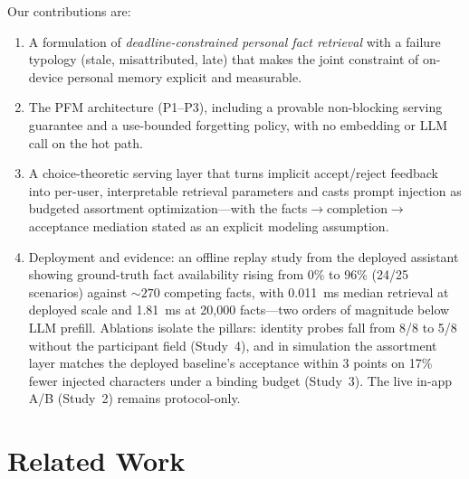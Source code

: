 \documentclass[letterpaper]{article}
\begin{document}
Our contributions are:
\begin{enumerate}
\item A formulation of \emph{deadline-constrained personal fact retrieval}
  with a failure typology (stale, misattributed, late) that makes the
  joint constraint of on-device personal memory explicit and measurable.
\item The PFM architecture (P1--P3), including a provable non-blocking
  serving guarantee and a use-bounded forgetting policy, with no
  embedding or LLM call on the hot path.
\item A choice-theoretic serving layer that turns implicit accept/reject
  feedback into per-user, interpretable retrieval parameters and casts
  prompt injection as budgeted assortment optimization---with the
  facts$\rightarrow$completion$\rightarrow$acceptance mediation stated as
  an explicit modeling assumption.
\item Deployment and evidence: an offline replay study from the deployed
  assistant showing ground-truth fact availability rising from 0\% to
  96\% (24/25 scenarios) against ${\sim}270$ competing facts, with
  0.011~ms median retrieval at deployed scale and 1.81~ms at 20{,}000
  facts---two orders of magnitude below LLM prefill. Ablations isolate
  the pillars: identity probes fall from 8/8 to 5/8 without the
  participant field (Study~4), and in simulation the assortment layer
  matches the deployed baseline's acceptance within 3 points on 17\%
  fewer injected characters under a binding budget (Study~3). The live
  in-app A/B (Study~2) remains protocol-only.
\end{enumerate}

\section{Related Work}
\end{document}
